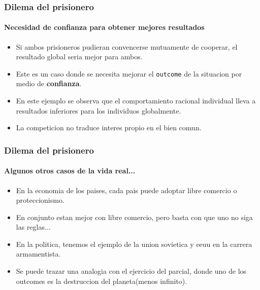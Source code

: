 \documentclass{beamer}
\begin{document}
\begin{frame}
    \frametitle{Dilema del prisionero}
  \framesubtitle{Necesidad de \textbf{confianza} para obtener mejores resultados}
  \begin{itemize}
    \setlength{\itemsep}{4pt}
    \item Si ambos prisioneros pudieran convencerse mutuamente de cooperar, el resultado global seria mejor para ambos.
    \pause
    \item Este es un caso donde se necesita mejorar el \texttt{outcome} de la situacion por medio de \textbf{confianza}.
    \pause 
    \item En este ejemplo se observa que el comportamiento racional individual lleva a resultados inferiores para los individuos globalmente.
    \pause
    \item La competicion no traduce interes propio en el bien comun. 
  \end{itemize}
\end{frame}

\begin{frame}
  \frametitle{Dilema del prisionero}
  \framesubtitle{Algunos otros casos de la vida real...}
  \begin{itemize}
    \setlength{\itemsep}{4pt}
    \item En la economia de los paises, cada pais puede adoptar libre comercio o proteccionismo.
    \pause
    \item En conjunto estan mejor con libre comercio, pero basta con que uno no siga las reglas...
    \pause 
    \item En la politica, tenemos el ejemplo de la union sovietica y eeuu en la carrera armamentista.
    \pause
    \item Se puede trazar una analogia con el ejercicio del parcial, donde uno de los outcomes es la destruccion del planeta(menos infinito).
  \end{itemize}
\end{frame}
\end{document}
